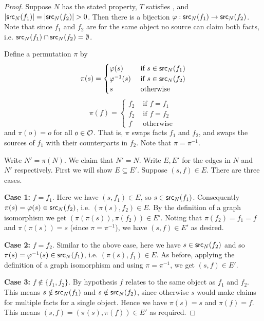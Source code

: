 \begin{proof}

    Suppose $N$ has the stated property, $T$ satisfies \symmetry{}, and $|\mathsf{src}_N(f_1)|
= |\mathsf{src}_N(f_2)| > 0$. Then there is a bijection $\varphi: \mathsf{src}_N(f_1) \to
\mathsf{src}_N(f_2)$. Note that since $f_1$ and $f_2$ are for the same object no source
can claim both facts, i.e. $\mathsf{src}_N(f_1) \cap \mathsf{src}_N(f_2) = \emptyset$.

Define a permutation $\pi$ by
\[
    \pi(s) = \begin{cases}
        \varphi(s) & \text{ if } s \in \mathsf{src}_N(f_1) \\
        \varphi^{-1}(s) & \text{ if } s \in \mathsf{src}_N(f_2) \\
        s & \text{ otherwise }
    \end{cases}
\]
\[
    \pi(f) = \begin{cases}
        f_2 & \text{ if } f = f_1 \\
        f_2 & \text{ if } f = f_2 \\
        f & \text{ otherwise }
    \end{cases}
\]
and $\pi(o) = o$ for all $o \in \mathcal{O}$. That is, $\pi$ swaps facts $f_1$ and
$f_2$, and swaps the sources of $f_1$ with their counterparts in $f_2$. Note
that $\pi = \pi^{-1}$.

Write $N' = \pi(N)$. We claim that $N' = N$. Write $E, E'$ for the edges
in $N$ and $N'$ respectively. First we will show $E \subseteq E'$. Suppose $(s,
f) \in E$. There are three cases.

\textbf{Case 1:} $f=f_1$. Here we have $(s, f_1) \in E$, so $s \in
\mathsf{src}_N(f_1)$. Consequently $\pi(s) = \varphi(s) \in \mathsf{src}_N(f_2)$, i.e. $(\pi(s),
f_2) \in E$. By the definition of a graph isomorphism we get $(\pi(\pi(s)),
\pi(f_2)) \in E'$. Noting that $\pi(f_2) = f_1 = f$ and $\pi(\pi(s)) = s$ (since
$\pi=\pi^{-1}$), we have $(s, f) \in E'$ as desired.

\textbf{Case 2:} $f = f_2$. Similar to the above case, here we have $s \in
\mathsf{src}_N(f_2)$ and so $\pi(s) = \varphi^{-1}(s) \in \mathsf{src}_N(f_1)$, i.e. $(\pi(s),
f_1) \in E$. As before, applying the definition of a graph isomorphism and
using $\pi=\pi^{-1}$, we get $(s, f) \in E'$.

\textbf{Case 3:} $f \notin \{f_1, f_2\}$. By hypothesis $f$ relates to the
same object as $f_1$ and $f_2$. This means $s \notin \mathsf{src}_N(f_1)$ and $s
\notin \mathsf{src}_N(f_2)$, since otherwise $s$ would make claims for multiple facts
for a single object. Hence we have $\pi(s)=s$ and $\pi(f)=f$. This means $(s,
f) = (\pi(s), \pi(f)) \in E'$ as required.


\end{proof}
